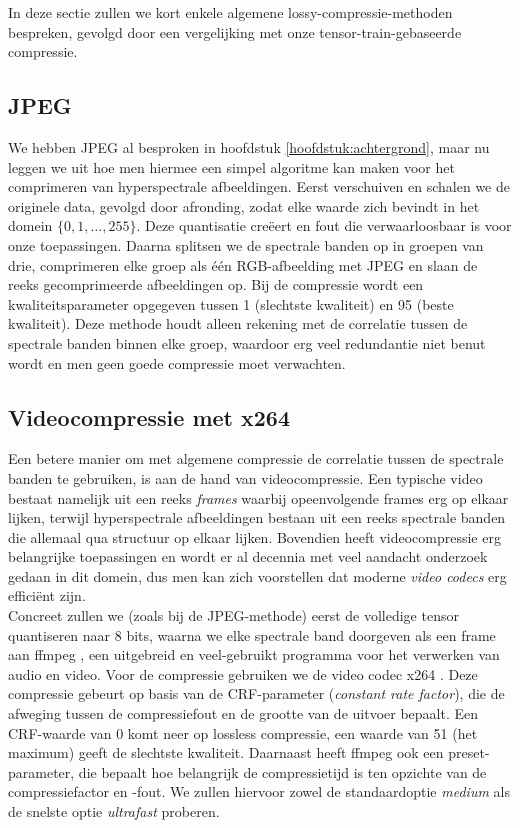 In deze sectie zullen we kort enkele algemene lossy-compressie-methoden bespreken, gevolgd door een vergelijking met onze tensor-train-gebaseerde compressie.

\newpage
\subsection{JPEG}

We hebben JPEG \cite{ref:jpeg} al besproken in hoofdstuk \ref{hoofdstuk:achtergrond}, maar nu leggen we uit hoe men hiermee een simpel algoritme kan maken voor het comprimeren van hyperspectrale afbeeldingen. Eerst verschuiven en schalen we de originele data, gevolgd door afronding, zodat elke waarde zich bevindt in het domein $\{0, 1, \dots, 255\}$. Deze quantisatie cre\"eert en fout die verwaarloosbaar is voor onze toepassingen. Daarna splitsen we de spectrale banden op in groepen van drie, comprimeren elke groep als \'e\'en RGB-afbeelding met JPEG en slaan de reeks gecomprimeerde afbeeldingen op. Bij de compressie wordt een kwaliteitsparameter opgegeven tussen 1 (slechtste kwaliteit) en 95 (beste kwaliteit). Deze methode houdt alleen rekening met de correlatie tussen de spectrale banden binnen elke groep, waardoor erg veel redundantie niet benut wordt en men geen goede compressie moet verwachten.

\newpage
\subsection{Videocompressie met x264}

Een betere manier om met algemene compressie de correlatie tussen de spectrale banden te gebruiken, is aan de hand van videocompressie. Een typische video bestaat namelijk uit een reeks \textit{frames} waarbij opeenvolgende frames erg op elkaar lijken, terwijl hyperspectrale afbeeldingen bestaan uit een reeks spectrale banden die allemaal qua structuur op elkaar lijken. Bovendien heeft videocompressie erg belangrijke toepassingen en wordt er al decennia met veel aandacht onderzoek gedaan in dit domein, dus men kan zich voorstellen dat moderne \textit{video codecs} erg effici\"ent zijn.\\

Concreet zullen we (zoals bij de JPEG-methode) eerst de volledige tensor quantiseren naar 8 bits, waarna we elke spectrale band doorgeven als een frame aan ffmpeg \cite{ref:ffmpeg}, een uitgebreid en veel-gebruikt programma voor het verwerken van audio en video. Voor de compressie gebruiken we de video codec x264 \cite{ref:x264}. Deze compressie gebeurt op basis van de CRF-parameter (\textit{constant rate factor}), die de afweging tussen de compressiefout en de grootte van de uitvoer bepaalt. Een CRF-waarde van 0 komt neer op lossless compressie, een waarde van 51 (het maximum) geeft de slechtste kwaliteit. Daarnaast heeft ffmpeg ook een preset-parameter, die bepaalt hoe belangrijk de compressietijd is ten opzichte van de compressiefactor en -fout. We zullen hiervoor zowel de standaardoptie \textit{medium} als de snelste optie \textit{ultrafast} proberen.

